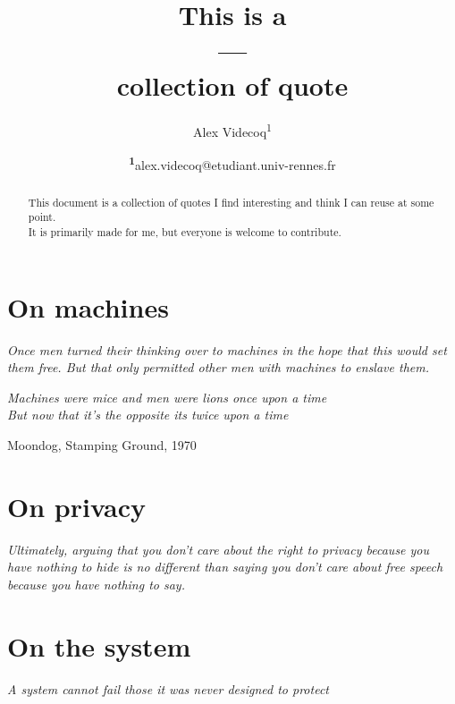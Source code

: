 \documentclass[
  a4paper, %
  12pt, %
  unnumberedsections, %
  twoside, %
  xcolor = {dvipsnames}
]{class}
\title{This is a\\---\\collection of quote} %
\author{%
  Alex Videcoq\textsuperscript{1}
}
\date{\footnotesize\textsuperscript{\textbf{1}}alex.videcoq@etudiant.univ-rennes.fr}
\begin{document}
\maketitle

\begin{abstract}
  \noindent This document is a collection of quotes I find
  interesting and think I can reuse at some point.\\
  It is primarily made for me, but everyone is welcome to contribute.
\end{abstract}

\section{On machines}
\textit{Once men turned their thinking over to machines in the hope
  that this would set them free.
But that only permitted other men with machines to enslave them.}\par
\cite{herbert_dune_1965} \par
\noindent
\textit{Machines were mice and men were lions once upon a time\\
But now that it's the opposite its twice upon a time}\par
Moondog, Stamping Ground, 1970

\section{On privacy}
\textit{Ultimately, arguing that you don't care about the right to
  privacy because you have nothing to hide is no different than saying
you don't care about free speech because you have nothing to say.}\par
\cite{snowden_privacy_2015} \par

\section{On the system}
\noindent
\textit{A system cannot fail those it was never designed to protect}\par
\cite{solidaritat_protect_2025}

\pagebreak
\printbibliography

\end{document}
